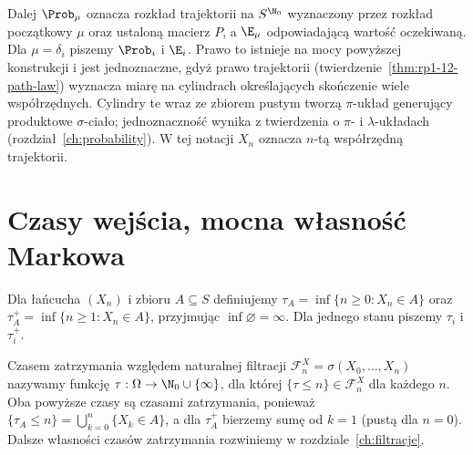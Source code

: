 Dalej $\Prob_\mu$ oznacza rozkład trajektorii
na $S^{\N_0}$ wyznaczony przez rozkład początkowy
$\mu$ oraz ustaloną macierz $P$, a $\E_\mu$
odpowiadającą wartość oczekiwaną.
Dla $\mu=\delta_i$ piszemy $\Prob_i$ i $\E_i$.
Prawo to istnieje na mocy powyższej konstrukcji
i jest jednoznaczne, gdyż prawo trajektorii
(twierdzenie~\ref{thm:rp1-12-path-law}) wyznacza
miarę na cylindrach określających skończenie wiele
współrzędnych. Cylindry te wraz ze zbiorem pustym
tworzą $\pi$-układ generujący produktowe $\sigma$-ciało;
jednoznaczność wynika z twierdzenia o $\pi$-
i $\lambda$-układach (rozdział~\ref{ch:probability}).
W tej notacji $X_n$ oznacza $n$-tą współrzędną
trajektorii.

\section{Czasy wejścia, mocna własność Markowa}

\begin{definicja}
Dla łańcucha $(X_n)$ i zbioru $A\subseteq S$ definiujemy
$\tau_A=\inf\{n\geq0:X_n\in A\}$ oraz
$\tau_A^+=\inf\{n\geq1:X_n\in A\}$,
przyjmując $\inf\varnothing=\infty$.
Dla jednego stanu piszemy $\tau_i$ i $\tau_i^+$.
\end{definicja}

Czasem zatrzymania względem naturalnej filtracji
$\mathcal F_n^X=\sigma(X_0,\ldots,X_n)$ nazywamy funkcję
$\tau:\Omega\to\N_0\cup\{\infty\}$, dla której
$\{\tau\leq n\}\in\mathcal F_n^X$ dla każdego $n$.
Oba powyższe czasy są czasami zatrzymania, ponieważ
$\{\tau_A\leq n\}=\bigcup_{k=0}^n\{X_k\in A\}$,
a dla $\tau_A^+$ bierzemy sumę od $k=1$ (pustą dla $n=0$).
Dalsze własności czasów zatrzymania rozwiniemy
w rozdziale~\ref{ch:filtracje}.

